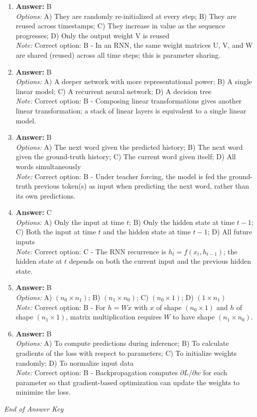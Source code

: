 \documentclass[12pt]{article}
\begin{document}
\begin{enumerate}[label=Q\arabic*.]
\\ \textit{Note:} Correct option: B - The forward pass computes the predicted output from inputs and current weights, then the loss is computed; weight updates happen in the backward pass.
\item \textbf{Answer:} B
\\ \textit{Options:} A) They are randomly re-initialized at every step; B) They are reused across timestamps; C) They increase in value as the sequence progresses; D) Only the output weight V is reused
\\ \textit{Note:} Correct option: B - In an RNN, the same weight matrices U, V, and W are shared (reused) across all time steps; this is parameter sharing.
\item \textbf{Answer:} B
\\ \textit{Options:} A) A deeper network with more representational power; B) A single linear model; C) A recurrent neural network; D) A decision tree
\\ \textit{Note:} Correct option: B - Composing linear transformations gives another linear transformation; a stack of linear layers is equivalent to a single linear model.
\item \textbf{Answer:} B
\\ \textit{Options:} A) The next word given the predicted history; B) The next word given the ground-truth history; C) The current word given itself; D) All words simultaneously
\\ \textit{Note:} Correct option: B - Under teacher forcing, the model is fed the ground-truth previous token(s) as input when predicting the next word, rather than its own predictions.
\item \textbf{Answer:} C
\\ \textit{Options:} A) Only the input at time $t$; B) Only the hidden state at time $t-1$; C) Both the input at time $t$ and the hidden state at time $t-1$; D) All future inputs
\\ \textit{Note:} Correct option: C - The RNN recurrence is $h_t = f(x_t, h_{t-1})$; the hidden state at $t$ depends on both the current input and the previous hidden state.
\item \textbf{Answer:} B
\\ \textit{Options:} A) $(n_0 \times n_1)$; B) $(n_1 \times n_0)$; C) $(n_0 \times 1)$; D) $(1 \times n_1)$
\\ \textit{Note:} Correct option: B - For $h = Wx$ with $x$ of shape $(n_0 \times 1)$ and $h$ of shape $(n_1 \times 1)$, matrix multiplication requires $W$ to have shape $(n_1 \times n_0)$.
\item \textbf{Answer:} B
\\ \textit{Options:} A) To compute predictions during inference; B) To calculate gradients of the loss with respect to parameters; C) To initialize weights randomly; D) To normalize input data
\\ \textit{Note:} Correct option: B - Backpropagation computes $\partial L / \partial w$ for each parameter so that gradient-based optimization can update the weights to minimize the loss.
\end{enumerate}

\vfill
\noindent\textit{End of Answer Key}
\end{document}
